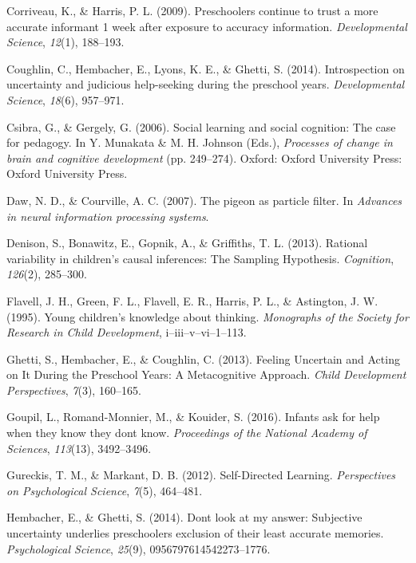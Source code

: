 \documentclass[a4paper,man,apacite,floatsintext]{apa6}
\begin{document}
\hypertarget{ref-Corriveau2009}{}
Corriveau, K., \& Harris, P. L. (2009). Preschoolers continue to trust a
more accurate informant 1 week after exposure to accuracy information.
\emph{Developmental Science}, \emph{12}(1), 188--193.

\hypertarget{ref-Coughlin2014}{}
Coughlin, C., Hembacher, E., Lyons, K. E., \& Ghetti, S. (2014).
Introspection on uncertainty and judicious help-seeking during the
preschool years. \emph{Developmental Science}, \emph{18}(6), 957--971.

\hypertarget{ref-Csibra2006}{}
Csibra, G., \& Gergely, G. (2006). Social learning and social cognition:
The case for pedagogy. In Y. Munakata \& M. H. Johnson (Eds.),
\emph{Processes of change in brain and cognitive development} (pp.
249--274). Oxford: Oxford University Press: Oxford University Press.

\hypertarget{ref-Daw2007}{}
Daw, N. D., \& Courville, A. C. (2007). The pigeon as particle filter.
In \emph{Advances in neural information processing systems}.

\hypertarget{ref-Denison2013}{}
Denison, S., Bonawitz, E., Gopnik, A., \& Griffiths, T. L. (2013).
Rational variability in children's causal inferences: The Sampling
Hypothesis. \emph{Cognition}, \emph{126}(2), 285--300.

\hypertarget{ref-Flavell1995}{}
Flavell, J. H., Green, F. L., Flavell, E. R., Harris, P. L., \&
Astington, J. W. (1995). Young children's knowledge about thinking.
\emph{Monographs of the Society for Research in Child Development},
i--iii--v--vi--1--113.

\hypertarget{ref-Ghetti2013}{}
Ghetti, S., Hembacher, E., \& Coughlin, C. (2013). Feeling Uncertain and
Acting on It During the Preschool Years: A Metacognitive Approach.
\emph{Child Development Perspectives}, \emph{7}(3), 160--165.

\hypertarget{ref-Goupil2016}{}
Goupil, L., Romand-Monnier, M., \& Kouider, S. (2016). Infants ask for
help when they know they dont know. \emph{Proceedings of the National
Academy of Sciences}, \emph{113}(13), 3492--3496.

\hypertarget{ref-Gureckis2012}{}
Gureckis, T. M., \& Markant, D. B. (2012). Self-Directed Learning.
\emph{Perspectives on Psychological Science}, \emph{7}(5), 464--481.

\hypertarget{ref-Hembacher2014}{}
Hembacher, E., \& Ghetti, S. (2014). Dont look at my answer: Subjective
uncertainty underlies preschoolers exclusion of their least accurate
memories. \emph{Psychological Science}, \emph{25}(9),
0956797614542273--1776.
\end{document}
